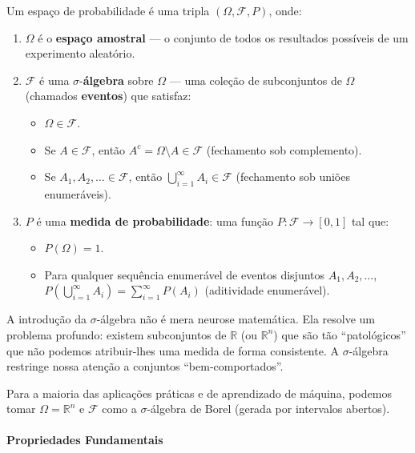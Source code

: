 \documentclass{tufte-handout}
\begin{document}
\begin{defn}
    Um espaço de probabilidade é uma tripla $(\Omega, \mathcal{F}, P)$, onde:
    \begin{enumerate}
        \item $\Omega$ é o \textbf{espaço amostral} --- o conjunto de todos os resultados
        possíveis de um experimento aleatório.
        \item $\mathcal{F}$ é uma $\sigma$-\textbf{álgebra} sobre $\Omega$ --- uma coleção
        de subconjuntos de $\Omega$ (chamados \textbf{eventos}) que satisfaz:
        \begin{itemize}
            \item $\Omega \in \mathcal{F}$.
            \item Se $A \in \mathcal{F}$, então $A^c = \Omega \setminus A \in \mathcal{F}$
            (fechamento sob complemento).
            \item Se $A_1, A_2, \dots \in \mathcal{F}$, então $\bigcup_{i=1}^\infty A_i \in \mathcal{F}$
            (fechamento sob uniões enumeráveis).
        \end{itemize}
        \item $P$ é uma \textbf{medida de probabilidade}: uma função $P: \mathcal{F} \to [0,1]$ tal que:
        \begin{itemize}
            \item $P(\Omega) = 1$.
            \item Para qualquer sequência enumerável de eventos disjuntos $A_1, A_2, \dots$,
            $P(\bigcup_{i=1}^\infty A_i) = \sum_{i=1}^\infty P(A_i)$ (aditividade enumerável).
        \end{itemize}
    \end{enumerate}
\end{defn}

A introdução da $\sigma$-álgebra não é mera neurose matemática. Ela resolve um problema
profundo: existem subconjuntos de $\mathbb{R}$ (ou $\mathbb{R}^n$) que são tão ``patológicos''
que não podemos atribuir-lhes uma medida de forma consistente. A $\sigma$-álgebra restringe
nossa atenção a conjuntos ``bem-comportados''.

Para a maioria das aplicações práticas e de aprendizado de máquina, podemos tomar $\Omega = \mathbb{R}^n$
e $\mathcal{F}$ como a $\sigma$-álgebra de Borel (gerada por intervalos abertos).

\paragraph{Propriedades Fundamentais}
\end{document}
